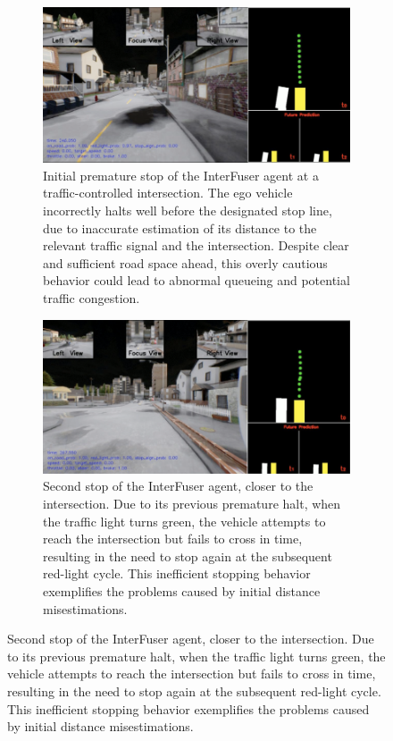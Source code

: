 \begin{figure}[htbp]
    \centering
    \begin{subfigure}[b]{0.45\textwidth}
        \centering
        \includegraphics[width=\columnwidth]{images/RS10_R0_firstStop.png}
        \caption{Initial premature stop of the InterFuser agent at a traffic-controlled intersection. The ego vehicle incorrectly halts well before the designated stop line, due to inaccurate estimation of its distance to the relevant traffic signal and the intersection. Despite clear and sufficient road space ahead, this overly cautious behavior could lead to abnormal queueing and potential traffic congestion.}
        \label{fig:RS10_premature_first_stop}
    \end{subfigure}
    \hfill
    \begin{subfigure}[b]{0.45\textwidth}
        \centering
        \includegraphics[width=\columnwidth]{images/RS10_R0_secondStop.png}
        \caption{Second stop of the InterFuser agent, closer to the intersection. Due to its previous premature halt, when the traffic light turns green, the vehicle attempts to reach the intersection but fails to cross in time, resulting in the need to stop again at the subsequent red-light cycle. This inefficient stopping behavior exemplifies the problems caused by initial distance misestimations.}

\end{subfigure}
\end{figure}
